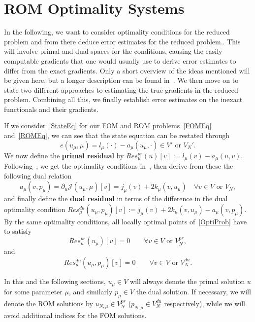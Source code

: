 \section{ROM Optimality Systems}\label{sec:ROMOptSys}

In the following, we want to consider optimality conditions for the reduced problem and from there deduce error estimates for the reduced problem..
This will involve primal and dual spaces for the conditions, causing the easily computable gradients that one would usually use to derive error estimates to differ from the exact gradients.
Only a short overview of the ideas mentioned will be given here, but a longer description can be found in~\cite[Section 3]{Keil2021}.
We then move on to state two different approaches to estimating the true gradients in the reduced problem.
Combining all this, we finally establish error estimates on the inexact functionals and their gradients.

If we consider~\eqref{StateEq} for our FOM and ROM problems~\eqref{FOMEq} and~\eqref{ROMEq}, we can see that the state equation can be restated through
\begin{equation*}
    e(u_\mu, \mu) = l_\mu(\cdot) - a_\mu(u_\mu, \cdot) \in V' \text{ or } V_N'.
\end{equation*}
We now define the \textbf{primal residual} by $Res_\mu^{pr}(u)[v] := l_\mu(v) - a_\mu(u, v)$.
Following~\cite[Corollary 1.3]{Hinze2009}, we get the optimality conditions in~\cite[Proposition 2.9]{Keil2021}, then derive from these the following dual relation
\begin{equation*}
    a_\mu(v, p_\mu) = \partial_u \mathcal{J}(u_\mu, \mu)[v] = j_\mu(v) + 2 k_\mu(v, u_\mu) \quad \forall v \in V \text{ or } V_N,
\end{equation*}
and finally define the \textbf{dual residual} in terms of the difference in the dual optimality condition $Res_\mu^{du}(u_\mu, p_\mu)[v] := j_\mu(v) + 2 k_\mu(v, u_\mu) - a_\mu(v, p_\mu)$.
By the same optimality conditions, all locally optimal points of~\eqref{OptiProb} have to satisfy
\begin{equation}\label{PrimalEq}
    Res_\mu^{pr}(u_\mu)[v] = 0 \qquad \forall v \in V \text{ or } V_N^{pr},
\end{equation}
and
\begin{equation}\label{DualEq}
    Res_\mu^{du}(u_\mu, p_\mu)[v] = 0 \qquad \forall v \in V \text{ or } V_N^{du}.
\end{equation}

In this and the following sections, $u_\mu \in V$ will always denote the primal solution $u$ for some parameter $\mu$, and similarly $p_\mu \in V$ the dual solution.
If necessary, we will denote the ROM solutions by $u_{N, \mu} \in V_N^{pr}$ ($p_{N, \mu} \in V_N^{du}$ respectively), while we will avoid additional indices for the FOM solutions.

